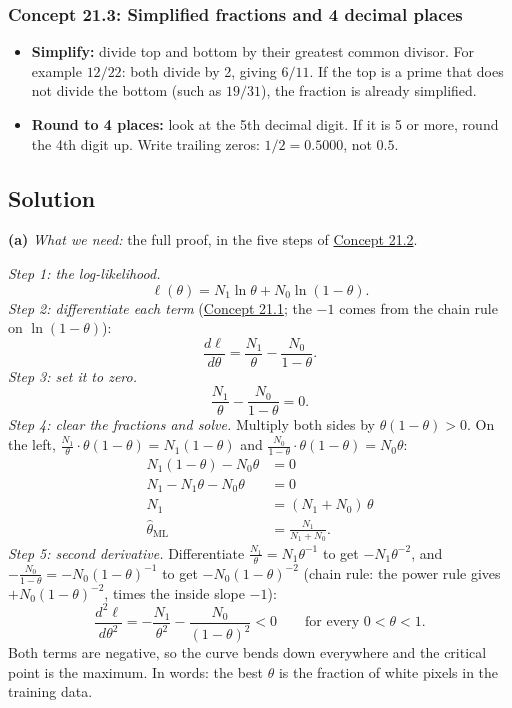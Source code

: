 \documentclass[12pt,a4paper]{article}
\begin{document}
\subsubsection{Concept 21.3: Simplified fractions and 4 decimal places}\label{c21-3}

\begin{itemize}[nosep]
  \item \textbf{Simplify:} divide top and bottom by their greatest common divisor. For example $12/22$: both divide by 2, giving $6/11$. If the top is a prime that does not divide the bottom (such as $19/31$), the fraction is already simplified.
  \item \textbf{Round to 4 places:} look at the 5th decimal digit. If it is 5 or more, round the 4th digit up. Write trailing zeros: $1/2=0.5000$, not $0.5$.
\end{itemize}

\subsection{Solution}

\textbf{(a)} \emph{What we need:} the full proof, in the five steps of \hyperref[c21-2]{Concept 21.2}.

\emph{Step 1: the log-likelihood.}
\[
\ell(\theta)=N_1\ln\theta+N_0\ln(1-\theta).
\]
\emph{Step 2: differentiate each term} (\hyperref[c21-1]{Concept 21.1}; the $-1$ comes from the chain rule on $\ln(1-\theta)$):
\[
\frac{d\ell}{d\theta}=\frac{N_1}{\theta}-\frac{N_0}{1-\theta}.
\]
\emph{Step 3: set it to zero.}
\[
\frac{N_1}{\theta}-\frac{N_0}{1-\theta}=0 .
\]
\emph{Step 4: clear the fractions and solve.} Multiply both sides by $\theta(1-\theta)>0$. On the left, $\frac{N_1}{\theta}\cdot\theta(1-\theta)=N_1(1-\theta)$ and $\frac{N_0}{1-\theta}\cdot\theta(1-\theta)=N_0\theta$:
\begin{align*}
N_1(1-\theta)-N_0\theta&=0\\
N_1-N_1\theta-N_0\theta&=0\\
N_1&=(N_1+N_0)\,\theta\\
\hat\theta_{\text{ML}}&=\frac{N_1}{N_1+N_0}.
\end{align*}
\emph{Step 5: second derivative.} Differentiate $\frac{N_1}{\theta}=N_1\theta^{-1}$ to get $-N_1\theta^{-2}$, and $-\frac{N_0}{1-\theta}=-N_0(1-\theta)^{-1}$ to get $-N_0(1-\theta)^{-2}$ (chain rule: the power rule gives $+N_0(1-\theta)^{-2}$, times the inside slope $-1$):
\[
\frac{d^2\ell}{d\theta^2}=-\frac{N_1}{\theta^2}-\frac{N_0}{(1-\theta)^2}<0\qquad\text{for every }0<\theta<1 .
\]
Both terms are negative, so the curve bends down everywhere and the critical point is the maximum. In words: the best $\theta$ is the fraction of white pixels in the training data.
\end{document}
